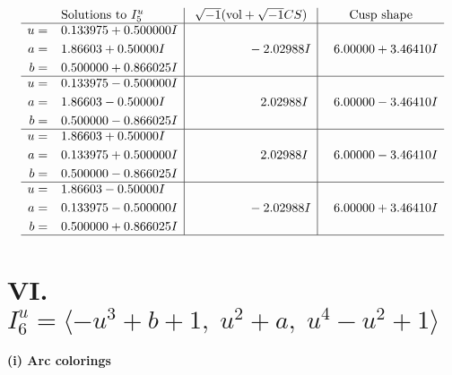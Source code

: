 \documentclass[1p]{elsarticle_modified}
\theoremstyle{definition}
\newcommand{\I}{\sqrt{-1}}
\begin{document}
$$\begin{array}{c|c|c}  
\text{Solutions to }I^u_{5}& \I (\text{vol} + \sqrt{-1}CS) & \text{Cusp shape}\\
 \hline 
\begin{aligned}
u &= \phantom{-}0.133975 + 0.500000 I \\
a &= \phantom{-}1.86603 + 0.50000 I \\
b &= \phantom{-}0.500000 + 0.866025 I\end{aligned}
 & \phantom{-0.000000 } -2.02988 I & \phantom{-}6.00000 + 3.46410 I \\ \hline\begin{aligned}
u &= \phantom{-}0.133975 - 0.500000 I \\
a &= \phantom{-}1.86603 - 0.50000 I \\
b &= \phantom{-}0.500000 - 0.866025 I\end{aligned}
 & \phantom{-0.000000 -}2.02988 I & \phantom{-}6.00000 - 3.46410 I \\ \hline\begin{aligned}
u &= \phantom{-}1.86603 + 0.50000 I \\
a &= \phantom{-}0.133975 + 0.500000 I \\
b &= \phantom{-}0.500000 - 0.866025 I\end{aligned}
 & \phantom{-0.000000 -}2.02988 I & \phantom{-}6.00000 - 3.46410 I \\ \hline\begin{aligned}
u &= \phantom{-}1.86603 - 0.50000 I \\
a &= \phantom{-}0.133975 - 0.500000 I \\
b &= \phantom{-}0.500000 + 0.866025 I\end{aligned}
 & \phantom{-0.000000 } -2.02988 I & \phantom{-}6.00000 + 3.46410 I\\
 \hline 
 \end{array}$$\newpage\newpage\renewcommand{\arraystretch}{1}
\centering \section*{VI. $I^u_{6}= \langle - u^3+b+1,\;u^2+a,\;u^4- u^2+1 \rangle$}
\flushleft \textbf{(i) Arc colorings}\\
\end{document}
